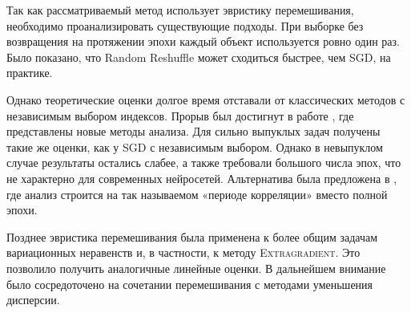 Так как рассматриваемый метод использует эвристику перемешивания, необходимо проанализировать существующие подходы. При выборке без возвращения на протяжении эпохи каждый объект используется ровно один раз. Было показано, что Random Reshuffle может сходиться быстрее, чем \textsc{SGD}, на практике.

Однако теоретические оценки долгое время отставали от классических методов с независимым выбором индексов. Прорыв был достигнут в работе \citep{mishchenko2020random}, где представлены новые методы анализа. Для сильно выпуклых задач получены такие же оценки, как у \textsc{SGD} с независимым выбором. Однако в невыпуклом случае результаты остались слабее, а также требовали большого числа эпох, что не характерно для современных нейросетей. Альтернатива была предложена в \citep{koloskova2024convergence}, где анализ строится на так называемом «периоде корреляции» вместо полной эпохи.

Позднее эвристика перемешивания была применена к более общим задачам вариационных неравенств и, в частности, к методу \textsc{Extragradient}. Это позволило получить аналогичные линейные оценки. В дальнейшем внимание было сосредоточено на сочетании перемешивания с методами уменьшения дисперсии.


